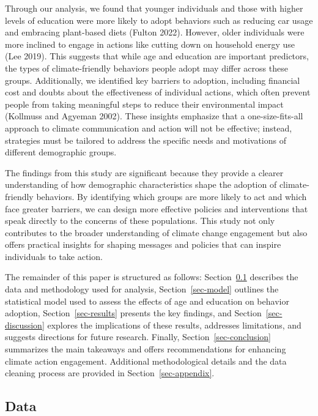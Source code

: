 \documentclass[
  letterpaper,
  DIV=11,
  numbers=noendperiod]{scrartcl}
\begin{document}
Through our analysis, we found that younger individuals and those with
higher levels of education were more likely to adopt behaviors such as
reducing car usage and embracing plant-based diets (Fulton 2022).
However, older individuals were more inclined to engage in actions like
cutting down on household energy use (Lee 2019). This suggests that
while age and education are important predictors, the types of
climate-friendly behaviors people adopt may differ across these groups.
Additionally, we identified key barriers to adoption, including
financial cost and doubts about the effectiveness of individual actions,
which often prevent people from taking meaningful steps to reduce their
environmental impact (Kollmuss and Agyeman 2002). These insights
emphasize that a one-size-fits-all approach to climate communication and
action will not be effective; instead, strategies must be tailored to
address the specific needs and motivations of different demographic
groups.

The findings from this study are significant because they provide a
clearer understanding of how demographic characteristics shape the
adoption of climate-friendly behaviors. By identifying which groups are
more likely to act and which face greater barriers, we can design more
effective policies and interventions that speak directly to the concerns
of these populations. This study not only contributes to the broader
understanding of climate change engagement but also offers practical
insights for shaping messages and policies that can inspire individuals
to take action.

The remainder of this paper is structured as follows:
Section~\ref{sec-data} describes the data and methodology used for
analysis, Section~\ref{sec-model} outlines the statistical model used to
assess the effects of age and education on behavior adoption,
Section~\ref{sec-results} presents the key findings, and
Section~\ref{sec-discussion} explores the implications of these results,
addresses limitations, and suggests directions for future research.
Finally, Section~\ref{sec-conclusion} summarizes the main takeaways and
offers recommendations for enhancing climate action engagement.
Additional methodological details and the data cleaning process are
provided in Section~\ref{sec-appendix}.

\subsection{Data}\label{sec-data}
\end{document}
